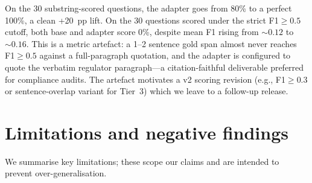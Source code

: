 \documentclass{article}
\begin{document}
On the 30 substring-scored questions, the adapter goes from 80\% to a perfect 100\%, a clean +20~pp lift. On the 30 questions scored under the strict F1$\geq0.5$ cutoff, both base and adapter score 0\%, despite mean F1 rising from $\sim0.12$ to $\sim0.16$. This is a metric artefact: a 1--2 sentence gold span almost never reaches F1$\geq0.5$ against a full-paragraph quotation, and the adapter is configured to quote the verbatim regulator paragraph---a citation-faithful deliverable preferred for compliance audits. The artefact motivates a v2 scoring revision (e.g., F1$\geq0.3$ or sentence-overlap variant for Tier~3) which we leave to a follow-up release.

\section{Limitations and negative findings}

We summarise key limitations; these scope our claims and are intended to prevent over-generalisation.
\end{document}
